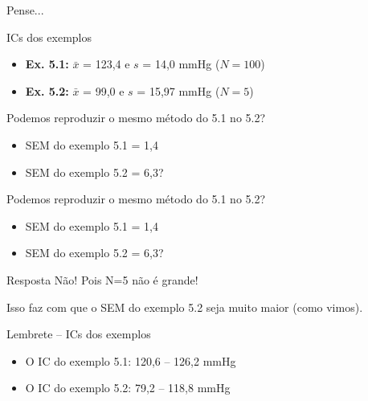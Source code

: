 \documentclass{beamer}
\begin{document}
\begin{frame}{\scriptsize Pense...}
  \begin{exampleblock}{ICs dos exemplos}
    \footnotesize
    \begin{itemize}
      \footnotesize
    \item {\bf Ex. 5.1:} $\bar{x}$ = 123,4 e $s$ = 14,0 mmHg ($N=100$)
    \item {\bf Ex. 5.2:} $\bar{x}$ = 99,0 e $s$ = 15,97 mmHg ($N=5$)
    \end{itemize}
  \end{exampleblock}
    \bigskip
  \begin{block}{Podemos reproduzir o mesmo método do 5.1 no 5.2?}
    \footnotesize
  \begin{itemize}
    \footnotesize
  \item SEM do exemplo 5.1 = 1,4
  \item SEM do exemplo 5.2 = 6,3?
  \end{itemize}
  \end{block}
\end{frame}

\begin{frame}{\scriptsize }
    \begin{block}{Podemos reproduzir o mesmo método do 5.1 no 5.2?}
    \footnotesize
  \begin{itemize}
    \footnotesize
  \item SEM do exemplo 5.1 = 1,4
  \item SEM do exemplo 5.2 = 6,3?
  \end{itemize}
  \end{block}
  \bigskip
  \begin{block}{Resposta}
    \footnotesize
    Não! Pois N=5 não é grande!

    \medskip
    Isso faz com que o SEM do exemplo 5.2 seja muito maior (como vimos).
  \end{block}
  \begin{exampleblock}{Lembrete -- ICs dos exemplos}
    \footnotesize
    \begin{itemize}
      \scriptsize
    \item O IC do exemplo 5.1: 120,6 -- 126,2 mmHg
    \item O IC do exemplo 5.2: 79,2 -- 118,8 mmHg
    \end{itemize}
  \end{exampleblock}
\end{frame}
\end{document}
